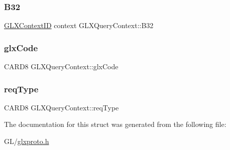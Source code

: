 \subsubsection{\texorpdfstring{B32}{B32}}
{\footnotesize\ttfamily \hyperlink{glx_8h_a17c7ca5b76cc448032df0b5352803005}{G\+L\+X\+Context\+ID} context G\+L\+X\+Query\+Context\+::\+B32}

\mbox{\label{struct_g_l_x_query_context_a159b7ac1416434d6d51776b0f7027023}} 
\subsubsection{\texorpdfstring{glx\+Code}{glxCode}}
{\footnotesize\ttfamily C\+A\+R\+D8 G\+L\+X\+Query\+Context\+::glx\+Code}

\mbox{\label{struct_g_l_x_query_context_a0edfc4ac725cb5030dc3de28a044c4b3}} 
\subsubsection{\texorpdfstring{req\+Type}{reqType}}
{\footnotesize\ttfamily C\+A\+R\+D8 G\+L\+X\+Query\+Context\+::req\+Type}



The documentation for this struct was generated from the following file\+:\begin{DoxyCompactItemize}
\item 
G\+L/\hyperlink{glxproto_8h}{glxproto.\+h}\end{DoxyCompactItemize}
